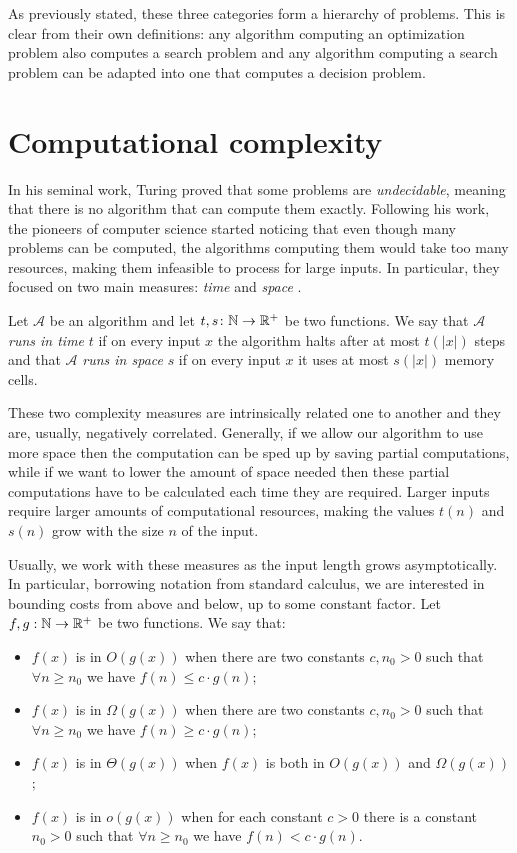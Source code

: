 As previously stated, these three categories form a hierarchy of problems. This is clear from their own definitions: any algorithm computing an optimization problem also computes a search problem and any algorithm computing a search problem can be adapted into one that computes a decision problem.

\section{Computational complexity}
\label{sec:complexity}
In his seminal work, Turing \cite{turing} proved that some problems are \textit{undecidable}, meaning that there is no algorithm that can compute them exactly. Following his work, the pioneers of computer science started noticing that even though many problems can be computed, the algorithms computing them would take too many resources, making them infeasible to process for large inputs. In particular, they focused on two main measures: \textit{time} and \textit{space} \cite{complexity_measures,sip_book,arora_barak}. 

\begin{definition}
  Let $\mathcal{A}$ be an algorithm and let $t, s \colon \mathbb{N} \to \mathbb{R}^+$ be two functions. We say that $\mathcal{A}$ \emph{runs in time} $t$ if on every input $x$ the algorithm halts after at most $t(|x|)$ steps and that $\mathcal{A}$ \emph{runs in space}
  $s$ if on every input $x$ it uses at most $s(|x|)$ memory cells.
\end{definition}

These two complexity measures are intrinsically related one to another and they are, usually, negatively correlated. Generally, if we allow our algorithm to use more space then the computation can be sped up by saving partial computations, while if we want to lower the amount of space needed then these partial computations have to be calculated each time they are required. Larger inputs require larger amounts of computational resources, making the values $t(n)$ and $s(n)$ grow with the size $n$ of the input.

Usually, we work with these measures as the input length grows asymptotically. In particular, borrowing notation from standard calculus, we are interested in bounding costs from above and below, up to some constant factor. Let $f,g : \mathbb{N} \to \mathbb{R}^+$ be two functions. We say that:
  \begin{itemize}[nosep]
    \item $f(x)$ is in $O(g(x))$ when there are two constants $c,n_0 > 0$ such that $\forall n \geq n_0$ we have $f(n) \leq c \cdot g(n)$;
    \item $f(x)$ is in $\Omega(g(x))$ when there are two constants $c,n_0 > 0$ such that $\forall n \geq n_0$ we have $f(n) \geq c \cdot g(n)$;
    \item $f(x)$ is in $\Theta(g(x))$ when $f(x)$ is both in $O(g(x))$ and $\Omega(g(x))$;
    \item $f(x)$ is in $o(g(x))$ when for each constant $c > 0$ there is a constant $n_0 > 0$ such that $\forall n \geq n_0$ we have $f(n) < c \cdot g(n)$.
  \end{itemize}

